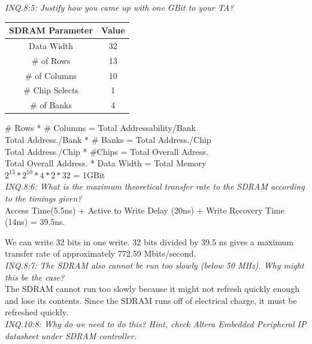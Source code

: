 \documentclass[journal, twocolumn, final,11pt,letterpaper]{IEEEtran}
\begin{document}
\textit{INQ.8:5: Justify how you came up with one GBit to your TA?} \\

\begin{table}[htbp]
	\centering
	\begin{tabular}{c|c}	%
		\toprule	%
		SDRAM Parameter & Value \\
		\midrule
		Data Width & 32 \\
		\# of Rows & 13\\
		\# of Columns & 10 \\
		\# Chip Selects & 1 \\
		\# of Banks & 4 \\
		\bottomrule	%
	\end{tabular}%
\end{table}%

\# Rows * \# Columns = Total Addressability/Bank  \\

Total Address./Bank * \# Banks = Total Address./Chip \\

Total Address./Chip * \#Chips = Total Overall Adress. \\

Total Overall Address. * Data Width = Total Memory \\

$2^{13} * 2^{10} * 4 * 2 * 32 $ = 1GBit \\

\textit{INQ.8:6: What is the maximum theoretical transfer rate to the SDRAM according to the timings given?} \\

Access Time(5.5ns) + Active to Write Delay (20ns) + Write Recovery Time (14ns) = 39.5ns.

We can write 32 bits in one write. 32 bits divided by 39.5 ns gives a maximum transfer rate of approximately 772.59 Mbits/second. \\ 


\textit{INQ.8:7: The SDRAM also cannot be run too slowly (below 50 MHz).  Why might this be the case?} \\

The SDRAM cannot run too slowly because it might not refresh quickly enough and lose its contents. Since the SDRAM runs off of electrical charge, it must be refreshed quickly. \\

\textit{INQ.10:8: Why do we need to do this? Hint, check Altera Embedded Peripheral IP datasheet under SDRAM controller.} \\
\end{document}

